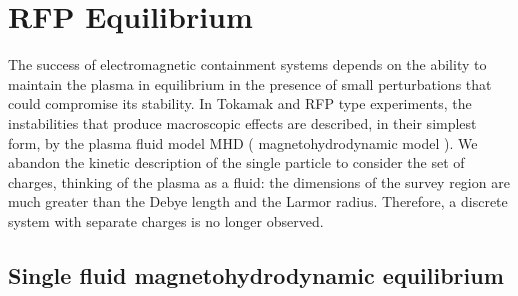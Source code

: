 \chapter{RFP Equilibrium}
\label{section:2_equilibrium}

The success of electromagnetic containment systems depends on the ability to maintain the plasma in equilibrium in the presence of small perturbations
that could compromise its stability. In Tokamak and RFP type experiments, the instabilities that produce macroscopic effects are described, in their simplest form, by the plasma fluid model MHD ( magnetohydrodynamic model ). 
We abandon the kinetic description of the single particle to consider the set of charges, thinking of the plasma as a fluid: the dimensions of the survey region are much greater than the Debye length and the Larmor radius. Therefore, a discrete system with separate charges is no longer observed.




\section{Single fluid magnetohydrodynamic equilibrium}

